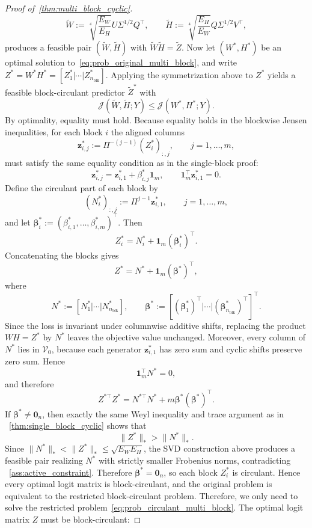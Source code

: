 \documentclass[11pt]{article}
\begin{document}
\begin{proof}[Proof of~\cref{thm:multi_block_cyclic}]
\[
\widetilde W:=\sqrt[4]{\frac{E_W}{E_H}} U\Sigma^{1/2}Q^\top,
\qquad
\widetilde H:=\sqrt[4]{\frac{E_H}{E_W}} Q\Sigma^{1/2}V^\top,
\]
produces a feasible pair \((\widetilde W,\widetilde H)\) with
\(\widetilde W\widetilde H=\widetilde Z\).
Now let \((W^*,H^*)\) be an optimal solution to~\cref{eq:prob_original_multi_block}, and write
\(Z^*=W^*H^*=[Z_1^*|\cdots|Z_{n_{\mathrm{blk}}}^*]\).
Applying the symmetrization above to \(Z^*\) yields a feasible block-circulant predictor
\(\widetilde Z^*\) with
\[
\mathcal J(\widetilde W,\widetilde H;Y)\le \mathcal J(W^*,H^*;Y).
\]
By optimality, equality must hold.
Because equality holds in the blockwise Jensen inequalities, for each block \(i\) the aligned columns
\[
\boldsymbol z_{i,j}^*:=\Pi^{-(j-1)}(Z_i^*)_{:,j},\qquad j=1,\ldots,m,
\]
must satisfy the same equality condition as in the single-block proof:
\[
\boldsymbol z_{i,j}^*=\boldsymbol z_{i,1}^*+\beta_{i,j}^*\boldsymbol 1_m,
\qquad
\boldsymbol 1_m^\top \boldsymbol z_{i,1}^*=0.
\]
Define the circulant part of each block by
\[
(N_i^*)_{:,j}:=\Pi^{j-1}\boldsymbol z_{i,1}^*,\qquad j=1,\ldots,m,
\]
and let \(\boldsymbol\beta_i^*:=(\beta_{i,1}^*,\dots,\beta_{i,m}^*)^\top\).
Then
\[
Z_i^*=N_i^*+\boldsymbol 1_m(\boldsymbol\beta_i^*)^\top.
\]
Concatenating the blocks gives
\[
Z^*=N^*+\boldsymbol 1_m(\boldsymbol\beta^*)^\top,
\]
where
\[
N^*:=[N_1^*|\cdots|N_{n_{\mathrm{blk}}}^*],
\qquad
\boldsymbol\beta^*:=[(\boldsymbol\beta_1^*)^\top|\cdots|(\boldsymbol\beta_{n_{\mathrm{blk}}}^*)^\top]^\top.
\]
Since the loss is invariant under columnwise additive shifts, replacing the product \(WH=Z^*\) by \(N^*\) leaves the objective value unchanged.
Moreover, every column of \(N^*\) lies in \(\mathcal V_0\), because each generator
\(\boldsymbol z_{i,1}^*\) has zero sum and cyclic shifts preserve zero sum. Hence
\[
\boldsymbol 1_m^\top N^*=0,
\]
and therefore
\[
Z^{*\top}Z^*
=
N^{*\top}N^*
+
m \boldsymbol\beta^*(\boldsymbol\beta^*)^\top.
\]
If \(\boldsymbol\beta^*\neq \boldsymbol{0}_n\), then exactly the same Weyl inequality and trace argument as in
~\cref{thm:single_block_cyclic} shows that
\[
\|Z^*\|_*>\|N^*\|_*.
\]
Since \(\|N^*\|_*<\|Z^*\|_*\le \sqrt{E_WE_H}\), the SVD construction above produces a feasible pair
realizing \(N^*\) with strictly smaller Frobenius norms, contradicting
~\cref{ass:active_constraint}. Therefore \(\boldsymbol\beta^*=\boldsymbol{0}_n\), so each block \(Z_i^*\) is circulant.
Hence every optimal logit matrix is block-circulant, and the original problem is equivalent to the restricted block-circulant problem.
Therefore, we only need to solve the restricted problem~\cref{eq:prob_circulant_multi_block}. The optimal logit matrix \(Z\) must be block-circulant:

\end{proof}
\end{document}
